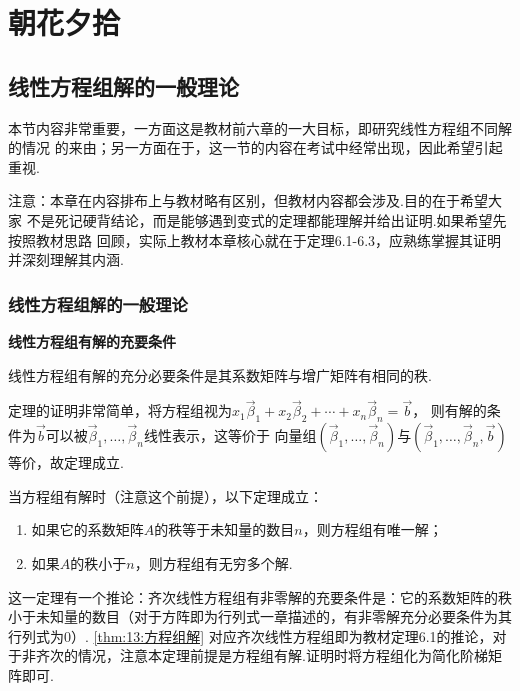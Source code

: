 \chapter{朝花夕拾}

\section{线性方程组解的一般理论}
本节内容非常重要，一方面这是教材前六章的一大目标，即研究线性方程组不同解的情况
的来由；另一方面在于，这一节的内容在考试中经常出现，因此希望引起重视.

注意：本章在内容排布上与教材略有区别，但教材内容都会涉及.目的在于希望大家
不是死记硬背结论，而是能够遇到变式的定理都能理解并给出证明.如果希望先按照教材思路
回顾，实际上教材本章核心就在于定理6.1-6.3，应熟练掌握其证明并深刻理解其内涵.
\subsection{线性方程组解的一般理论}
\begin{theorem} \textbf{\heiti 线性方程组有解的充要条件}

    线性方程组有解的充分必要条件是其系数矩阵与增广矩阵有相同的秩.
\end{theorem}
定理的证明非常简单，将方程组视为$x_1\vec{\beta}_1+x_2\vec{\beta}_2+\cdots+x_n\vec{\beta}_n=\vec{b}$，
则有解的条件为$\vec{b}$可以被$\vec{\beta}_1,\ldots,\vec{\beta}_n$线性表示，这等价于
向量组$(\vec{\beta}_1,\ldots,\vec{\beta}_n)$与$(\vec{\beta}_1,\ldots,\vec{\beta}_n,\vec{b})$等价，故定理成立.

\begin{theorem} \label{thm:13:方程组解}
    当方程组有解时（注意这个前提），以下定理成立：
    \begin{enumerate}
        \item 如果它的系数矩阵$A$的秩等于未知量的数目$n$，则方程组有唯一解；

        \item 如果$A$的秩小于$n$，则方程组有无穷多个解.
    \end{enumerate}
\end{theorem}
这一定理有一个推论：齐次线性方程组有非零解的充要条件是：它的系数矩阵的秩小于未知量的数目（对于方阵即为行列式一章描述的，有非零解充分必要条件为其行列式为0）.
\autoref{thm:13:方程组解} 对应齐次线性方程组即为教材定理6.1的推论，对于非齐次的情况，注意本定理前提是方程组有解.证明时将方程组化为简化阶梯矩阵即可.
